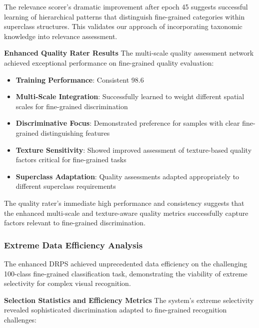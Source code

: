 \documentclass[12pt]{article}
\begin{document}
The relevance scorer's dramatic improvement after epoch 45 suggests successful learning of hierarchical patterns that distinguish fine-grained categories within superclass structures. This validates our approach of incorporating taxonomic knowledge into relevance assessment.

\textbf{Enhanced Quality Rater Results}
The multi-scale quality assessment network achieved exceptional performance on fine-grained quality evaluation:

\begin{itemize}
\item \textbf{Training Performance}: Consistent 98.6%
\item \textbf{Multi-Scale Integration}: Successfully learned to weight different spatial scales for fine-grained discrimination
\item \textbf{Discriminative Focus}: Demonstrated preference for samples with clear fine-grained distinguishing features
\item \textbf{Texture Sensitivity}: Showed improved assessment of texture-based quality factors critical for fine-grained tasks
\item \textbf{Superclass Adaptation}: Quality assessments adapted appropriately to different superclass requirements
\end{itemize}

The quality rater's immediate high performance and consistency suggests that the enhanced multi-scale and texture-aware quality metrics successfully capture factors relevant to fine-grained discrimination.

\subsubsection{Extreme Data Efficiency Analysis}\label{extreme-efficiency-results}

The enhanced DRPS achieved unprecedented data efficiency on the challenging 100-class fine-grained classification task, demonstrating the viability of extreme selectivity for complex visual recognition.

\textbf{Selection Statistics and Efficiency Metrics}
The system's extreme selectivity revealed sophisticated discrimination adapted to fine-grained recognition challenges:
\end{document}
